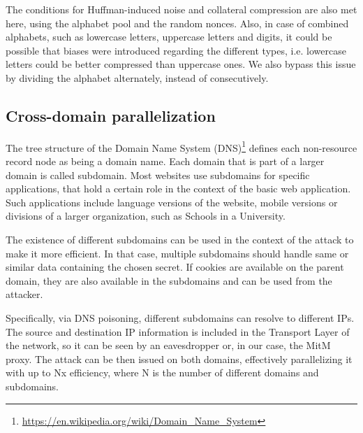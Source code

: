 The conditions for Huffman-induced noise and collateral compression are also met
here, using the alphabet pool and the random nonces. Also, in case of combined
alphabets, such as lowercase letters, uppercase letters and digits, it could be
possible that biases were introduced regarding the different types, i.e.
lowercase letters could be better compressed than uppercase ones. We also bypass
this issue by dividing the alphabet alternately, instead of consecutively.

\subsection{Cross-domain parallelization}

The tree structure of the Domain Name System
(DNS)\footnote{\url{https://en.wikipedia.org/wiki/Domain_Name_System}} defines
each non-resource record node as being a domain name. Each domain that is part
of a larger domain is called subdomain. Most websites use subdomains for
specific applications, that hold a certain role in the context of the basic web
application. Such applications include language versions of the website, mobile
versions or divisions of a larger organization, such as Schools in a University.

The existence of different subdomains can be used in the context of the attack
to make it more efficient. In that case, multiple subdomains should handle same
or similar data containing the chosen secret. If cookies are available on the
parent domain, they are also available in the subdomains and can be used from
the attacker.

Specifically, via DNS poisoning, different subdomains can resolve to different
IPs. The source and destination IP information is included in the Transport
Layer of the network, so it can be seen by an eavesdropper or, in our case, the
MitM proxy. The attack can be then issued on both domains, effectively
parallelizing it with up to Nx efficiency, where N is the number of different
domains and subdomains.
